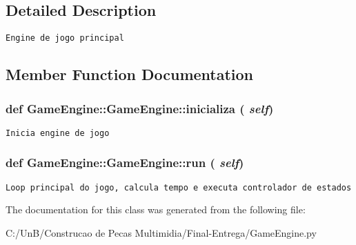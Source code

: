 \subsection{Detailed Description}


\begin{footnotesize}\begin{verbatim}Engine de jogo principal\end{verbatim}
\end{footnotesize}
 

\subsection{Member Function Documentation}
\hypertarget{class_game_engine_1_1_game_engine_e5520eb2e80e74026b44cfe5209390bd}{
\subsubsection[{inicializa}]{\setlength{\rightskip}{0pt plus 5cm}def GameEngine::GameEngine::inicializa ( {\em self})}}
\label{class_game_engine_1_1_game_engine_e5520eb2e80e74026b44cfe5209390bd}




\begin{footnotesize}\begin{verbatim}Inicia engine de jogo\end{verbatim}
\end{footnotesize}
 \hypertarget{class_game_engine_1_1_game_engine_b5688ddd57efff581aae796bccfdeeb1}{
\subsubsection[{run}]{\setlength{\rightskip}{0pt plus 5cm}def GameEngine::GameEngine::run ( {\em self})}}
\label{class_game_engine_1_1_game_engine_b5688ddd57efff581aae796bccfdeeb1}




\begin{footnotesize}\begin{verbatim}Loop principal do jogo, calcula tempo e executa controlador de estados\end{verbatim}
\end{footnotesize}
 

The documentation for this class was generated from the following file:\begin{CompactItemize}
\item 
C:/UnB/Construcao de Pecas Multimidia/Final-Entrega/GameEngine.py\end{CompactItemize}
